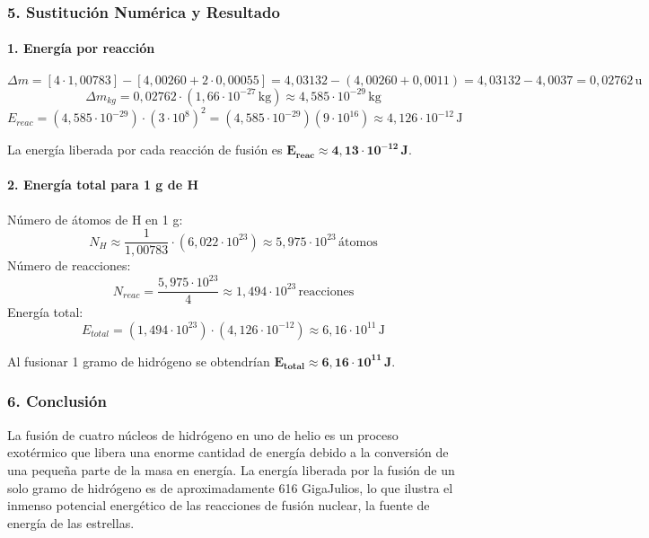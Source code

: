 \subsubsection*{5. Sustitución Numérica y Resultado}
\paragraph{1. Energía por reacción}
$$ \Delta m = [4 \cdot 1,00783] - [4,00260 + 2 \cdot 0,00055] = 4,03132 - (4,00260 + 0,0011) = 4,03132 - 4,0037 = 0,02762 \, \text{u} $$
$$ \Delta m_{kg} = 0,02762 \cdot (1,66\cdot10^{-27}\,\text{kg}) \approx 4,585 \cdot 10^{-29} \, \text{kg} $$
$$ E_{reac} = (4,585 \cdot 10^{-29}) \cdot (3\cdot10^8)^2 = (4,585 \cdot 10^{-29})(9 \cdot 10^{16}) \approx 4,126 \cdot 10^{-12} \, \text{J} $$
\begin{cajaresultado}
    La energía liberada por cada reacción de fusión es $\boldsymbol{E_{reac} \approx 4,13 \cdot 10^{-12} \, \textbf{J}}$.
\end{cajaresultado}

\paragraph{2. Energía total para 1 g de H}
Número de átomos de H en 1 g:
$$ N_H \approx \frac{1}{1,00783} \cdot (6,022 \cdot 10^{23}) \approx 5,975 \cdot 10^{23} \, \text{átomos} $$
Número de reacciones:
$$ N_{reac} = \frac{5,975 \cdot 10^{23}}{4} \approx 1,494 \cdot 10^{23} \, \text{reacciones} $$
Energía total:
$$ E_{total} = (1,494 \cdot 10^{23}) \cdot (4,126 \cdot 10^{-12}) \approx 6,16 \cdot 10^{11} \, \text{J} $$
\begin{cajaresultado}
    Al fusionar 1 gramo de hidrógeno se obtendrían $\boldsymbol{E_{total} \approx 6,16 \cdot 10^{11} \, \textbf{J}}$.
\end{cajaresultado}

\subsubsection*{6. Conclusión}
\begin{cajaconclusion}
La fusión de cuatro núcleos de hidrógeno en uno de helio es un proceso exotérmico que libera una enorme cantidad de energía debido a la conversión de una pequeña parte de la masa en energía. La energía liberada por la fusión de un solo gramo de hidrógeno es de aproximadamente 616 GigaJulios, lo que ilustra el inmenso potencial energético de las reacciones de fusión nuclear, la fuente de energía de las estrellas.
\end{cajaconclusion}

